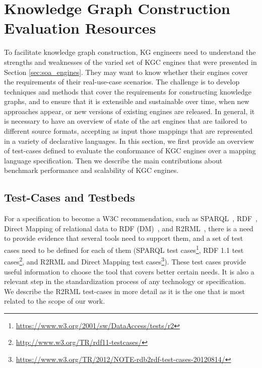 \section{Knowledge Graph Construction Evaluation Resources}
\label{sec:soa_evaluations}
To facilitate knowledge graph construction, KG engineers need to understand the strengths and weaknesses of the varied set of KGC engines that were presented in Section \ref{sec:soa_engines}. They may want to know whether their engines cover the requirements of their real-use-case scenarios. The challenge is to develop techniques and methods that cover the requirements for constructing knowledge graphs, and to ensure that it is extensible and sustainable over time, when new approaches appear, or new versions of existing engines are released. In general, it is necessary to have an overview of state of the art engines that are tailored to different source formats, accepting as input those mappings that are represented in a variety of declarative languages. In this section, we first provide an overview of test-cases defined to evaluate the conformance of KGC engines over a mapping language specification. Then we describe the main contributions about benchmark performance and scalability of KGC engines.


\subsection{Test-Cases and Testbeds}
For a specification to become a W3C recommendation, such as SPARQL~\citep{SPARQL}, RDF~\citep{RDF}, Direct Mapping of relational data to RDF (DM)~\citep{directMapping}, and R2RML~\citep{R2RML}, there is a need to provide evidence that several tools need to support them, and a set of test cases need to be defined for each of them (SPARQL test cases\footnote{ \url{https://www.w3.org/2001/sw/DataAccess/tests/r2}}, RDF 1.1 test cases\footnote{ \url{http://www.w3.org/TR/rdf11-testcases/}}, and R2RML and Direct Mapping test cases\footnote{\url{https://www.w3.org/TR/2012/NOTE-rdb2rdf-test-cases-20120814/}}). These test cases provide useful information to choose the tool that covers better certain needs. It is also a relevant step in the standardization process of any technology or specification. We describe the R2RML test-cases in more detail as it is the one that is most related to the scope of our work.

